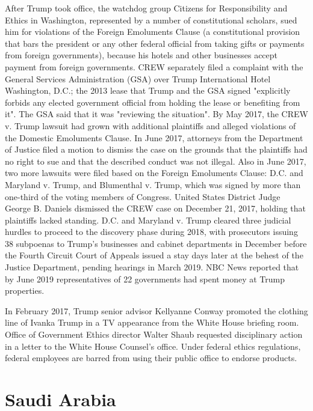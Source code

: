 After Trump took office, the watchdog group Citizens for Responsibility
and Ethics in Washington, represented by a number of constitutional
scholars, sued him for violations of the Foreign Emoluments Clause (a
constitutional provision that bars the president or any other federal
official from taking gifts or payments from foreign governments),
because his hotels and other businesses accept payment from foreign
governments. CREW separately filed a complaint with the General Services
Administration (GSA) over Trump International Hotel Washington, D.C.;
the 2013 lease that Trump and the GSA signed "explicitly forbids any
elected government official from holding the lease or benefiting from
it". The GSA said that it was "reviewing the situation". By May 2017,
the CREW v. Trump lawsuit had grown with additional plaintiffs and
alleged violations of the Domestic Emoluments Clause. In June 2017,
attorneys from the Department of Justice filed a motion to dismiss the
case on the grounds that the plaintiffs had no right to sue and that the
described conduct was not illegal. Also in June 2017, two more lawsuits
were filed based on the Foreign Emoluments Clause: D.C. and Maryland v.
Trump, and Blumenthal v. Trump, which was signed by more than one-third
of the voting members of Congress. United States District Judge George
B. Daniels dismissed the CREW case on December 21, 2017, holding that
plaintiffs lacked standing. D.C. and Maryland v. Trump cleared three
judicial hurdles to proceed to the discovery phase during 2018, with
prosecutors issuing 38 subpoenas to Trump's businesses and cabinet
departments in December before the Fourth Circuit Court of Appeals
issued a stay days later at the behest of the Justice Department,
pending hearings in March 2019. NBC News reported that by June 2019
representatives of 22 governments had spent money at Trump properties.

In February 2017, Trump senior advisor Kellyanne Conway promoted the
clothing line of Ivanka Trump in a TV appearance from the White House
briefing room. Office of Government Ethics director Walter Shaub
requested disciplinary action in a letter to the White House Counsel's
office. Under federal ethics regulations, federal employees are barred
from using their public office to endorse products.

\section{Saudi Arabia}\label{saudi-arabia}

